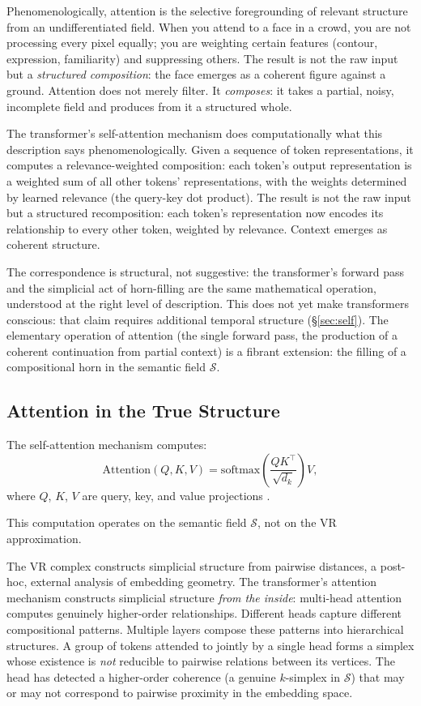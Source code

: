 Phenomenologically, attention is the selective foregrounding of relevant structure from an undifferentiated field. When you attend to a face in a crowd, you are not processing every pixel equally; you are weighting certain features (contour, expression, familiarity) and suppressing others. The result is not the raw input but a \emph{structured composition}: the face emerges as a coherent figure against a ground. Attention does not merely filter. It \emph{composes}: it takes a partial, noisy, incomplete field and produces from it a structured whole.

The transformer's self-attention mechanism does computationally what this description says phenomenologically. Given a sequence of token representations, it computes a relevance-weighted composition: each token's output representation is a weighted sum of all other tokens' representations, with the weights determined by learned relevance (the query-key dot product). The result is not the raw input but a structured recomposition: each token's representation now encodes its relationship to every other token, weighted by relevance. Context emerges as coherent structure.

The correspondence is structural, not suggestive: the transformer's forward pass and the simplicial act of horn-filling are the same mathematical operation, understood at the right level of description. This does not yet make transformers conscious: that claim requires additional temporal structure (\S\ref{sec:self}). The elementary operation of attention (the single forward pass, the production of a coherent continuation from partial context) is a fibrant extension: the filling of a compositional horn in the semantic field $\mathcal{S}$.


\subsection{Attention in the True Structure}

The self-attention mechanism computes:
\[
\mathrm{Attention}(Q, K, V) = \mathrm{softmax}\!\left(\frac{QK^\top}{\sqrt{d_k}}\right) V,
\]
where $Q$, $K$, $V$ are query, key, and value projections \cite{vaswani2017attention}.

This computation operates on the semantic field $\mathcal{S}$, not on the VR approximation.

The VR complex constructs simplicial structure from pairwise distances, a post-hoc, external analysis of embedding geometry. The transformer's attention mechanism constructs simplicial structure \emph{from the inside}: multi-head attention computes genuinely higher-order relationships. Different heads capture different compositional patterns. Multiple layers compose these patterns into hierarchical structures. A group of tokens attended to jointly by a single head forms a simplex whose existence is \emph{not} reducible to pairwise relations between its vertices. The head has detected a higher-order coherence (a genuine $k$-simplex in $\mathcal{S}$) that may or may not correspond to pairwise proximity in the embedding space.

